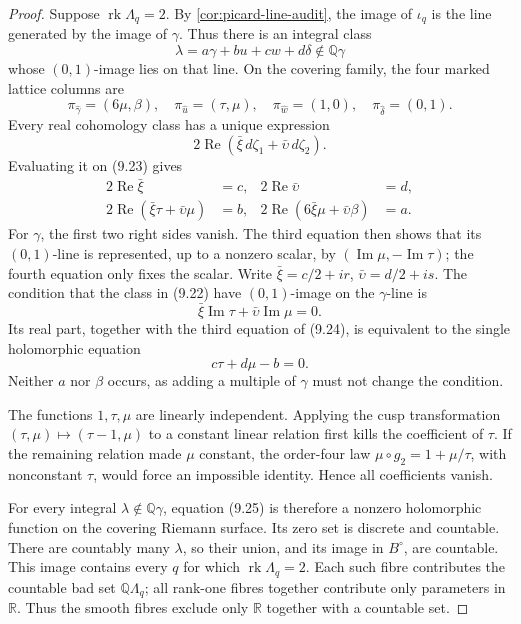\begin{proof}
Suppose \(\operatorname{rk}\Lambda_q=2\).  By
\cref{cor:picard-line-audit}, the image of \(\iota_q\) is the line
generated by the image of \(\gamma\).  Thus there is an integral class
\[
 \lambda=a\gamma+bu+cw+d\delta\notin\mathbb Q\gamma
\tag{9.22}
\]
whose \((0,1)\)-image lies on that line.  On the covering family, the four
marked lattice columns are
\[
 \pi_{\widehat\gamma}=(6\mu,\beta),\quad
 \pi_{\widehat u}=(\tau,\mu),\quad
 \pi_{\widehat w}=(1,0),\quad
 \pi_{\widehat\delta}=(0,1).
\tag{9.23}
\]
Every real cohomology class has a unique expression
\[
 2\operatorname{Re}(\bar\xi\,d\zeta_1+
                       \bar\upsilon\,d\zeta_2).
\]
Evaluating it on (9.23) gives
\[
\begin{aligned}
2\operatorname{Re}\bar\xi&=c,&
2\operatorname{Re}\bar\upsilon&=d,\\
2\operatorname{Re}(\bar\xi\tau+\bar\upsilon\mu)&=b,&
2\operatorname{Re}(6\bar\xi\mu+\bar\upsilon\beta)&=a.
\end{aligned}
\tag{9.24}
\]
For \(\gamma\), the first two right sides vanish.  The third equation then
shows that its \((0,1)\)-line is represented, up to a nonzero scalar, by
\((\operatorname{Im}\mu,-\operatorname{Im}\tau)\); the fourth equation
only fixes the scalar.  Write
\(\bar\xi=c/2+ir\), \(\bar\upsilon=d/2+is\).  The condition that the class
in (9.22) have \((0,1)\)-image on the \(\gamma\)-line is
\[
 \bar\xi\operatorname{Im}\tau+
 \bar\upsilon\operatorname{Im}\mu=0.
\]
Its real part, together with the third equation of (9.24), is equivalent
to the single holomorphic equation
\[
 c\tau+d\mu-b=0.
\tag{9.25}
\]
Neither \(a\) nor \(\beta\) occurs, as adding a multiple of \(\gamma\)
must not change the condition.

The functions \(1,\tau,\mu\) are linearly independent.  Applying the cusp
transformation \((\tau,\mu)\mapsto(\tau-1,\mu)\) to a constant linear
relation first kills the coefficient of \(\tau\).  If the remaining
relation made \(\mu\) constant, the order-four law
\(\mu\circ g_2=1+\mu/\tau\), with nonconstant \(\tau\), would force an
impossible identity.  Hence all coefficients vanish.

For every integral \(\lambda\notin\mathbb Q\gamma\), equation (9.25) is
therefore a nonzero holomorphic function on the covering Riemann surface.
Its zero set is discrete and countable.  There are countably many
\(\lambda\), so their union, and its image in \(B^\circ\), are countable.
This image contains every \(q\) for which
\(\operatorname{rk}\Lambda_q=2\).  Each such fibre contributes the
countable bad set \(\mathbb Q\Lambda_q\); all rank-one fibres together
contribute only parameters in \(\mathbb R\).  Thus the smooth fibres
exclude only \(\mathbb R\) together with a countable set.


\end{proof}
